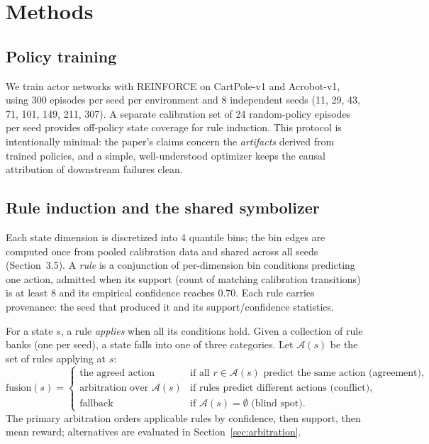 \documentclass[11pt]{article}
\begin{document}
\section{Methods}
\label{sec:methods}

\subsection{Policy training}

We train actor networks with REINFORCE on CartPole-v1 and Acrobot-v1, using 300 episodes per seed per environment and 8 independent seeds (11, 29, 43, 71, 101, 149, 211, 307). A separate calibration set of 24 random-policy episodes per seed provides off-policy state coverage for rule induction. This protocol is intentionally minimal: the paper's claims concern the \textit{artifacts} derived from trained policies, and a simple, well-understood optimizer \cite{williams1992,sutton2018} keeps the causal attribution of downstream failures clean.

\subsection{Rule induction and the shared symbolizer}

Each state dimension is discretized into 4 quantile bins; the bin edges are computed once from pooled calibration data and shared across all seeds (Section~3.5). A \textit{rule} is a conjunction of per-dimension bin conditions predicting one action, admitted when its support (count of matching calibration transitions) is at least 8 and its empirical confidence reaches $0.70$. Each rule carries provenance: the seed that produced it and its support/confidence statistics.

For a state $s$, a rule \textit{applies} when all its conditions hold. Given a collection of rule banks (one per seed), a state falls into one of three categories. Let $\mathcal{A}(s)$ be the set of rules applying at $s$:
\begin{equation}
\mathrm{fusion}(s) = \begin{cases}
\text{the agreed action} & \text{if all } r \in \mathcal{A}(s) \text{ predict the same action (agreement)},\\
\text{arbitration over } \mathcal{A}(s) & \text{if rules predict different actions (conflict)},\\
\text{fallback} & \text{if } \mathcal{A}(s) = \emptyset \text{ (blind spot)}.
\end{cases}
\end{equation}
The primary arbitration orders applicable rules by confidence, then support, then mean reward; alternatives are evaluated in Section~\ref{sec:arbitration}.
\end{document}
